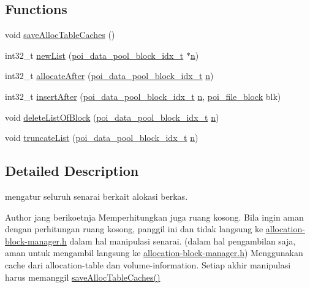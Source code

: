 \subsection*{Functions}
\begin{DoxyCompactItemize}
\item 
void \hyperlink{allocation-table_8c_a20af25d3b441d1f25e4830ee2173480c}{save\-Alloc\-Table\-Caches} ()
\item 
int32\-\_\-t \hyperlink{allocation-table_8c_ada2e09277dd8e97a2b2b75484b738126}{new\-List} (\hyperlink{data-pool-block-manager_8h_a87e19ab8290bcd76be1c7db1e90cc6f6}{poi\-\_\-data\-\_\-pool\-\_\-block\-\_\-idx\-\_\-t} $\ast$\hyperlink{allocation-table-test_8c_a24010dade8ebab3f87a48022772cd975}{n})
\item 
int32\-\_\-t \hyperlink{allocation-table_8c_a89ea9558bd50decb1bbbf85e569fe6c5}{allocate\-After} (\hyperlink{data-pool-block-manager_8h_a87e19ab8290bcd76be1c7db1e90cc6f6}{poi\-\_\-data\-\_\-pool\-\_\-block\-\_\-idx\-\_\-t} \hyperlink{allocation-table-test_8c_a24010dade8ebab3f87a48022772cd975}{n})
\item 
int32\-\_\-t \hyperlink{allocation-table_8c_a6de48f9bdf37e8005b9973a75d07633a}{insert\-After} (\hyperlink{data-pool-block-manager_8h_a87e19ab8290bcd76be1c7db1e90cc6f6}{poi\-\_\-data\-\_\-pool\-\_\-block\-\_\-idx\-\_\-t} \hyperlink{allocation-table-test_8c_a24010dade8ebab3f87a48022772cd975}{n}, \hyperlink{structpoi__file__block}{poi\-\_\-file\-\_\-block} blk)
\item 
void \hyperlink{allocation-table_8c_a8d703df55ad80bb8fb1177a0542065b6}{delete\-List\-Of\-Block} (\hyperlink{data-pool-block-manager_8h_a87e19ab8290bcd76be1c7db1e90cc6f6}{poi\-\_\-data\-\_\-pool\-\_\-block\-\_\-idx\-\_\-t} \hyperlink{allocation-table-test_8c_a24010dade8ebab3f87a48022772cd975}{n})
\item 
void \hyperlink{allocation-table_8c_a986965542b07562f2f205f9d68043a9c}{truncate\-List} (\hyperlink{data-pool-block-manager_8h_a87e19ab8290bcd76be1c7db1e90cc6f6}{poi\-\_\-data\-\_\-pool\-\_\-block\-\_\-idx\-\_\-t} \hyperlink{allocation-table-test_8c_a24010dade8ebab3f87a48022772cd975}{n})
\end{DoxyCompactItemize}


\subsection{Detailed Description}
mengatur seluruh senarai berkait alokasi berkas. \begin{DoxyAuthor}{Author}
jang berikoetnja Memperhitungkan juga ruang kosong. Bila ingin aman dengan perhitungan ruang kosong, panggil ini dan tidak langsung ke \hyperlink{allocation-block-manager_8h}{allocation-\/block-\/manager.\-h} dalam hal manipulasi senarai. (dalam hal pengambilan saja, aman untuk mengambil langsung ke \hyperlink{allocation-block-manager_8h}{allocation-\/block-\/manager.\-h}) Menggunakan cache dari allocation-\/table dan volume-\/information. Setiap akhir manipulasi harus memanggil \hyperlink{allocation-table_8c_a20af25d3b441d1f25e4830ee2173480c}{save\-Alloc\-Table\-Caches()} 
\end{DoxyAuthor}


